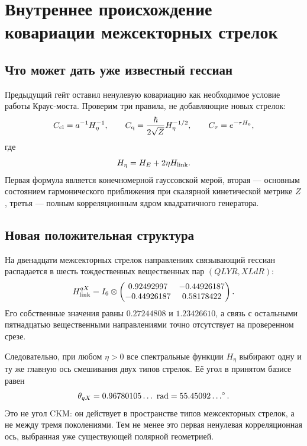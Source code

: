 \chapter{Внутреннее происхождение ковариации межсекторных стрелок}
\label{ch:v8-cross-arrow-covariance-origin-gate}

\section{Что может дать уже известный гессиан}

Предыдущий гейт оставил ненулевую ковариацию как необходимое условие
работы Краус-моста. Проверим три правила, не добавляющие новых стрелок:
\begin{equation}
 C_{\rm cl}=a^{-1}H_\eta^{-1},\qquad
 C_{\rm q}=\frac{\hbar}{2\sqrt Z}H_\eta^{-1/2},\qquad
 C_\tau=e^{-\tau H_\eta},
 \label{eq:v8-three-internal-covariance-candidates}
\end{equation}
где
\begin{equation}
 H_\eta=H_E+2\eta H_{\rm link}.
\end{equation}
Первая формула является конечномерной гауссовской мерой, вторая ---
основным состоянием гармонического приближения при скалярной кинетической
метрике $Z$, третья --- полным корреляционным ядром квадратичного
генератора.

\section{Новая положительная структура}

На двенадцати межсекторных стрелок направлениях связывающий гессиан распадается в шесть
тождественных вещественных пар $(QLYR,XLdR)$:
\begin{equation}
 H_{\rm link}^{qX}
 =I_6\otimes
 \begin{pmatrix}
 0.92492997&-0.44926187\\
 -0.44926187&0.58178422
 \end{pmatrix}.
 \label{eq:v8-linking-repeated-cross-pair}
\end{equation}
Его собственные значения равны $0.27244808$ и $1.23426610$, а связь с
остальными пятнадцатью вещественными направлениями точно отсутствует на
проверенном срезе.

Следовательно, при любом $\eta>0$ все спектральные функции $H_\eta$
выбирают одну и ту же главную ось смешивания двух типов стрелок. Её угол в
принятом базисе равен
\begin{equation}
 \theta_{qX}=0.96780105\ldots\ {\rm rad}
 =55.45092\ldots^\circ.
 \label{eq:v8-cross-covariance-axis}
\end{equation}
Это не угол CKM: он действует в пространстве типов межсекторных стрелок, а
не между тремя поколениями. Тем не менее это первая ненулевая
корреляционная ось, выбранная уже существующей полярной геометрией.

